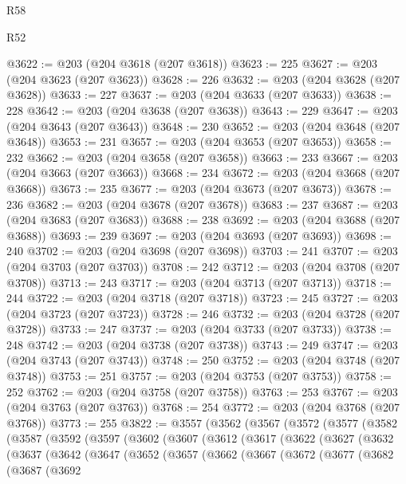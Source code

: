 \begin{lexlean}{R58}
\begin{lexlean}{R52}
\begin{coremodule}
{{{{{{{{{{{{{{{{{{{{{{{{{{{{{{{{{{{{{{{{{{{{{{{{{{{{{{{{{{{{{{{{{{{{{{{{{{{{{{{{{{{{{{{{{{{{{{{{{{{{{{{{{{{{{{{{{{{{{{{{{{{{{{{{{{{{{{{{{{{{{{{{{{{{{{{{{{{{{{{{{{{{{{{{{{{{{{{{{{{{{{{{{{{{{{{{{{{{{{@3622 := @203 (@204 @3618 (@207 @3618))
@3623 := 225
@3627 := @203 (@204 @3623 (@207 @3623))
@3628 := 226
@3632 := @203 (@204 @3628 (@207 @3628))
@3633 := 227
@3637 := @203 (@204 @3633 (@207 @3633))
@3638 := 228
@3642 := @203 (@204 @3638 (@207 @3638))
@3643 := 229
@3647 := @203 (@204 @3643 (@207 @3643))
@3648 := 230
@3652 := @203 (@204 @3648 (@207 @3648))
@3653 := 231
@3657 := @203 (@204 @3653 (@207 @3653))
@3658 := 232
@3662 := @203 (@204 @3658 (@207 @3658))
@3663 := 233
@3667 := @203 (@204 @3663 (@207 @3663))
@3668 := 234
@3672 := @203 (@204 @3668 (@207 @3668))
@3673 := 235
@3677 := @203 (@204 @3673 (@207 @3673))
@3678 := 236
@3682 := @203 (@204 @3678 (@207 @3678))
@3683 := 237
@3687 := @203 (@204 @3683 (@207 @3683))
@3688 := 238
@3692 := @203 (@204 @3688 (@207 @3688))
@3693 := 239
@3697 := @203 (@204 @3693 (@207 @3693))
@3698 := 240
@3702 := @203 (@204 @3698 (@207 @3698))
@3703 := 241
@3707 := @203 (@204 @3703 (@207 @3703))
@3708 := 242
@3712 := @203 (@204 @3708 (@207 @3708))
@3713 := 243
@3717 := @203 (@204 @3713 (@207 @3713))
@3718 := 244
@3722 := @203 (@204 @3718 (@207 @3718))
@3723 := 245
@3727 := @203 (@204 @3723 (@207 @3723))
@3728 := 246
@3732 := @203 (@204 @3728 (@207 @3728))
@3733 := 247
@3737 := @203 (@204 @3733 (@207 @3733))
@3738 := 248
@3742 := @203 (@204 @3738 (@207 @3738))
@3743 := 249
@3747 := @203 (@204 @3743 (@207 @3743))
@3748 := 250
@3752 := @203 (@204 @3748 (@207 @3748))
@3753 := 251
@3757 := @203 (@204 @3753 (@207 @3753))
@3758 := 252
@3762 := @203 (@204 @3758 (@207 @3758))
@3763 := 253
@3767 := @203 (@204 @3763 (@207 @3763))
@3768 := 254
@3772 := @203 (@204 @3768 (@207 @3768))
@3773 := 255
@3822 := @3557
    (@3562
      (@3567
        (@3572
          (@3577
            (@3582
              (@3587
                (@3592
                  (@3597
                    (@3602
                      (@3607
                        (@3612
                          (@3617
                            (@3622
                              (@3627
                                (@3632
                                  (@3637
                                    (@3642
                                      (@3647
                                        (@3652
                                          (@3657
                                            (@3662
                                              (@3667
                                                (@3672
                                                  (@3677
                                                    (@3682
                                                      (@3687
                                                        (@3692
}}}}}}}}}}}}}}}}}}}}}}}}}}}}}}}}}}}}}}}}}}}}}}}}}}}}}}}}}}}}}}}}}}}}}}}}}}}}}}}}}}}}}}}}}}}}}}}}}}}}}}}}}}}}}}}}}}}}}}}}}}}}}}}}}}}}}}}}}}}}}}}}}}}}}}}}}}}}}}}}}}}}}}}}}}}}}}}}}}}}}}}}}}}}}}}}}}}}}}
\end{coremodule}
\end{lexlean}
\end{lexlean}
